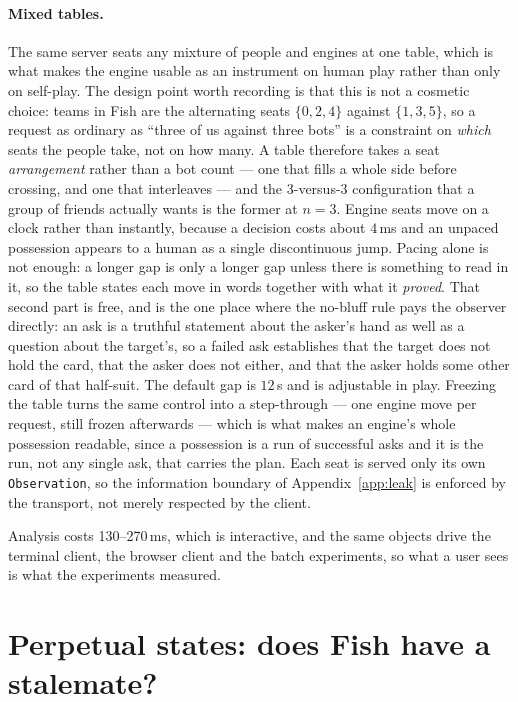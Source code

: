 \documentclass[11pt,a4paper]{article}
\begin{document}
\paragraph{Mixed tables.} The same server seats any mixture of people and
engines at one table, which is what makes the engine usable as an instrument on
human play rather than only on self-play. The design point worth recording is
that this is not a cosmetic choice: teams in Fish are the alternating seats
$\{0,2,4\}$ against $\{1,3,5\}$, so a request as ordinary as ``three of us
against three bots'' is a constraint on \emph{which} seats the people take, not
on how many. A table therefore takes a seat \emph{arrangement} rather than a bot
count --- one that fills a whole side before crossing, and one that interleaves
--- and the 3-versus-3 configuration that a group of friends actually wants is
the former at $n=3$. Engine seats move on a clock rather than instantly, because
a decision costs about $4$\,ms and an unpaced possession appears to a human as a
single discontinuous jump. Pacing alone is not enough: a longer gap is
only a longer gap unless there is something to read in it, so the table
states each move in words together with what it \emph{proved}. That
second part is free, and is the one place where the no-bluff rule pays
the observer directly: an ask is a truthful statement about the asker's
hand as well as a question about the target's, so a failed ask
establishes that the target does not hold the card, that the asker does
not either, and that the asker holds some other card of that half-suit.
The default gap is $12$\,s and is adjustable in play. Freezing the table
turns the same control into a step-through --- one engine move per
request, still frozen afterwards --- which is what makes an engine's
whole possession readable, since a possession is a run of successful
asks and it is the run, not any single ask, that carries the plan. Each seat is served only its own
\texttt{Observation}, so the information boundary of
Appendix~\ref{app:leak} is enforced by the transport, not merely respected by
the client.

Analysis costs 130--270\,ms, which is interactive, and the same objects drive
the terminal client, the browser client and the batch experiments, so what a
user sees is what the experiments measured.

\section{Perpetual states: does Fish have a stalemate?}
\label{sec:perpetual}
\end{document}
